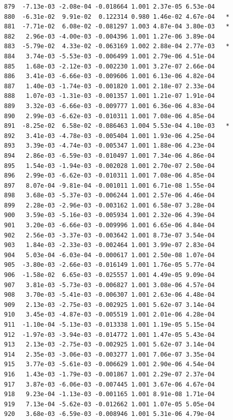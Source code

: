 \documentclass[
  letterpaper,
  DIV=11,
  numbers=noendperiod]{scrartcl}
\begin{document}
\begin{verbatim}
879  -7.13e-03 -2.08e-04 -0.018664 1.001 2.37e-05 6.53e-04    
880  -6.31e-02  9.91e-02  0.122314 0.980 1.46e-02 4.67e-04   *
881  -7.71e-02  6.08e-02 -0.081297 1.003 4.87e-04 3.80e-03   *
882   2.96e-03 -4.00e-03 -0.004396 1.001 1.27e-06 3.89e-04    
883  -5.79e-02  4.33e-02 -0.063169 1.002 2.88e-04 2.77e-03   *
884   3.74e-03 -5.53e-03 -0.006499 1.001 2.79e-06 4.51e-04    
885   1.68e-03 -2.12e-03 -0.002230 1.001 3.27e-07 2.66e-04    
886   3.41e-03 -6.66e-03 -0.009606 1.001 6.13e-06 4.82e-04    
887   1.40e-03 -1.74e-03 -0.001820 1.001 2.18e-07 2.33e-04    
888   1.07e-03 -1.31e-03 -0.001357 1.001 1.21e-07 1.91e-04    
889   3.32e-03 -6.66e-03 -0.009777 1.001 6.36e-06 4.83e-04    
890   2.99e-03 -6.62e-03 -0.010311 1.001 7.08e-06 4.85e-04    
891  -8.25e-02  6.58e-02 -0.086463 1.004 5.53e-04 4.10e-03   *
892   3.41e-03 -4.78e-03 -0.005404 1.001 1.93e-06 4.25e-04    
893   3.39e-03 -4.74e-03 -0.005347 1.001 1.88e-06 4.23e-04    
894   2.86e-03 -6.59e-03 -0.010497 1.001 7.34e-06 4.86e-04    
895   1.54e-03 -1.94e-03 -0.002028 1.001 2.70e-07 2.50e-04    
896   2.99e-03 -6.62e-03 -0.010311 1.001 7.08e-06 4.85e-04    
897   8.07e-04 -9.81e-04 -0.001011 1.001 6.71e-08 1.55e-04    
898   3.68e-03 -5.37e-03 -0.006244 1.001 2.57e-06 4.46e-04    
899   2.28e-03 -2.96e-03 -0.003162 1.001 6.58e-07 3.28e-04    
900   3.59e-03 -5.16e-03 -0.005934 1.001 2.32e-06 4.39e-04    
901   3.20e-03 -6.66e-03 -0.009996 1.001 6.65e-06 4.84e-04    
902   2.56e-03 -3.37e-03 -0.003642 1.001 8.73e-07 3.54e-04    
903   1.84e-03 -2.33e-03 -0.002464 1.001 3.99e-07 2.83e-04    
904   5.03e-04 -6.03e-04 -0.000617 1.001 2.50e-08 1.07e-04    
905  -3.80e-03 -2.66e-03 -0.016149 1.001 1.76e-05 5.77e-04    
906  -1.58e-02  6.65e-03 -0.025557 1.001 4.49e-05 9.09e-04    
907   3.81e-03 -5.73e-03 -0.006827 1.001 3.08e-06 4.57e-04    
908   3.70e-03 -5.41e-03 -0.006307 1.001 2.63e-06 4.48e-04    
909   2.13e-03 -2.75e-03 -0.002925 1.001 5.62e-07 3.14e-04    
910   3.45e-03 -4.87e-03 -0.005519 1.001 2.01e-06 4.28e-04    
911  -1.10e-04 -5.13e-03 -0.013338 1.001 1.19e-05 5.15e-04    
912  -1.97e-03 -3.94e-03 -0.014772 1.001 1.47e-05 5.43e-04    
913   2.13e-03 -2.75e-03 -0.002925 1.001 5.62e-07 3.14e-04    
914   2.35e-03 -3.06e-03 -0.003277 1.001 7.06e-07 3.35e-04    
915   3.77e-03 -5.61e-03 -0.006629 1.001 2.90e-06 4.54e-04    
916   1.43e-03 -1.79e-03 -0.001867 1.001 2.29e-07 2.37e-04    
917   3.87e-03 -6.06e-03 -0.007445 1.001 3.67e-06 4.67e-04    
918   9.23e-04 -1.13e-03 -0.001165 1.001 8.91e-08 1.71e-04    
919   7.13e-04 -5.62e-03 -0.012662 1.001 1.07e-05 5.05e-04    
920   3.68e-03 -6.59e-03 -0.008946 1.001 5.31e-06 4.79e-04    

\end{verbatim}
\end{document}
